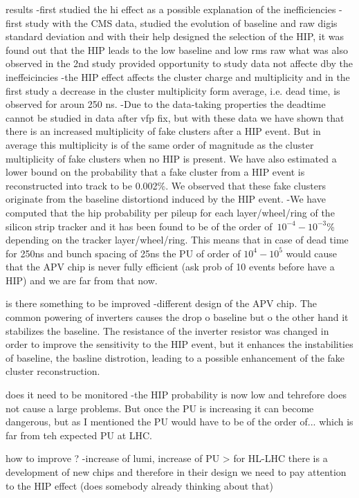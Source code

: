 results
	-first studied the hi effect as a possible explanation of the inefficiencies
	-first study with the CMS data, studied the evolution of baseline and raw digis standard deviation and with their help designed the selection of the HIP, it was found out that the HIP leads to the low baseline and low rms raw what was also observed in the 2nd study provided opportunity to study data not affecte dby the ineffeicincies
	-the HIP effect affects the cluster charge and multiplicity and in the first study a decrease in the cluster multiplicity form average, i.e. dead time, is observed for aroun 250 ns.
	-Due to the data-taking properties the deadtime cannot be studied in data after vfp fix, but with these data we have shown that there is an increased multiplicity of fake clusters after a HIP event. But in average this multiplicity is of the same order of magnitude as the cluster multiplicity of fake clusters when no HIP is present. We have also estimated a lower bound on the probability that a fake cluster from a HIP event is reconstructed into track to be 0.002\%. We observed that these fake clusters originate from the baseline distortiond induced by the HIP event. 
	-We have computed that the hip probability per pileup for each layer/wheel/ring of the silicon strip tracker and it has been found to be of the order of~$10^{-4}-10^{-3}$\% depending on the tracker layer/wheel/ring. This means that in case of dead time for 250ns and bunch spacing of 25ns the PU of order of $10^4-10^5$  would cause that the APV chip is never fully efficient (ask prob of 10 events before have a HIP) and we are far from that now.
 
is there something to be improved
	-different design of the APV chip. The common powering of inverters causes the drop o baseline but o the other hand it stabilizes the baseline. The resistance of the inverter resistor was changed in order to improve the sensitivity to the HIP event, but it enhances the instabilities of baseline, the basline distrotion, leading to a possible enhancement of the fake cluster reconstruction.

does it need to be monitored
	-the HIP probability is now low and tehrefore does not cause a large problems. But once the PU is increasing it can become dangerous, but as I mentioned the PU would have to be of the order of... which is far from teh expected PU at LHC.
 
how to improve ?
	-increase of lumi, increase of PU > for HL-LHC there is a development of new chips and therefore in their design we need to pay attention to the HIP effect (does somebody already thinking about that)

